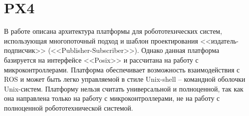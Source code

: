 \section{PX4}

В работе \cite{meier2015px4} описана архитектура платформы для 
робототехнческих систем, использующая многопоточный подход и 
шаблон проектирования <<издатель-подписчик>> 
(<<Publisher-Subscriber>>). 
Однако данная платформа базируется на интерфейсе <<Posix>> и 
рассчитана на работу с микроконтроллерами. Платформа 
обеспечивает возможность взаимодействия с ROS и может быть легко 
управляемой в стиле Unix-shell – командной оболочки Unix-систем. 
Платформу нельзя считать универсальной и полноценной, так как 
она направлена только на работу с микроконтроллерами, не на 
работу с полноценной робототехнической системой.